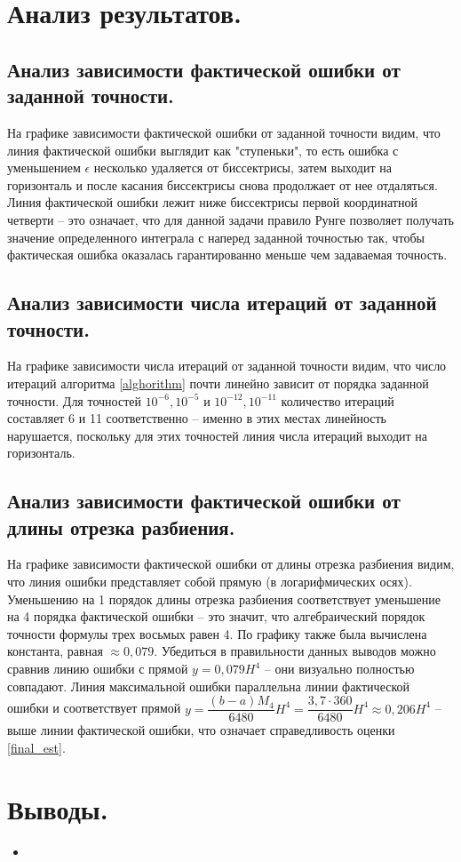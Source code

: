 \documentclass[a4paper, 12pt]{article}
\begin{document}
	\section{Анализ результатов.}
	
	\subsection{Анализ зависимости фактической ошибки от заданной точности.} 
	
	На графике зависимости фактической ошибки от заданной точности видим, что линия фактической ошибки выглядит как "ступеньки", то есть ошибка с уменьшением $\epsilon$ несколько удаляется от биссектрисы, затем выходит на горизонталь и после касания биссектрисы снова продолжает от нее отдаляться. Линия фактической ошибки лежит ниже биссектрисы первой координатной четверти -- это означает, что для данной задачи правило Рунге позволяет получать значение определенного интеграла с наперед заданной точностью так, чтобы фактическая ошибка оказалась гарантированно меньше чем задаваемая точность. 
	
	\subsection{Анализ зависимости числа итераций от заданной точности.}
	
	На графике зависимости числа итераций от заданной точности видим, что число итераций алгоритма \ref{alghorithm} почти линейно зависит от порядка заданной точности. Для точностей $10^{-6},10^{-5}$ и $10^{-12},10^{-11}$ количество итераций составляет 6 и 11 соответственно -- именно в этих местах линейность нарушается, поскольку для этих точностей линия числа итераций выходит на горизонталь.
	
	\subsection{Анализ зависимости фактической ошибки от длины отрезка разбиения.}
	
	На графике зависимости фактической ошибки от длины отрезка разбиения видим, что линия ошибки представляет собой прямую (в логарифмических осях). Уменьшению на 1 порядок длины отрезка разбиения соответствует уменьшение на 4 порядка фактической ошибки -- это значит, что алгебраический порядок точности формулы трех восьмых равен 4. По графику также была вычислена константа, равная $\approx 0,079$. Убедиться в правильности данных выводов можно сравнив линию ошибки с прямой $y=0,079H^4$ -- они визуально полностью совпадают. Линия максимальной ошибки параллельна линии фактической ошибки и соответствует прямой $y=\dfrac{(b-a)M_4}{6480}H^4=\dfrac{3,7\cdot360}{6480}H^4\approx0,206H^4$ -- выше линии фактической ошибки, что означает справедливость оценки \eqref{final_est}.
	
	\section{Выводы.}
	
	\begin{itemize}
		\item
	\end{itemize}
	
\end{document}
